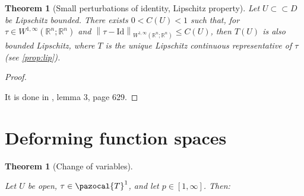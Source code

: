 \documentclass[english,a4paper,9pt,oneside]{scrbook}	%
\theoremstyle{break}
\newtheorem{thm}[equation]{Theorem}
\newtheorem{prop}[equation]{Proposition}
\newenvironment{mproof}[1][\proofname]{%
  \begin{proof}[#1]$ $\par\nobreak\ignorespaces
}{%
  \end{proof}
}
\renewcommand*{\proofname}{Proof}
\theoremstyle{remark}
\newcommand{\mR}{\mathbb{R}}
\newcommand{\norm}[1]{\left\lVert#1\right\rVert}
\newcommand{\cc}{\subset\subset}
\newcommand{\cT}{\pazocal{T}}
\newcommand{\id}{\text{Id}}
\newcommand{\te}{\theta}
\newcommand{\Te}{\Theta}
\begin{document}
\begin{appendices}
\begin{thm}[Small perturbations of identity, Lipschitz property]
\label{thm:ptb_id_lip}
Let $U\cc D$ be Lipschitz bounded. There exists $0<C(U)<1$ such that, for $\tau \in W^{1,\infty}(\mR^n;\mR^n)$ and $\norm{\tau - \id}_{W^{1,\infty}(\mR^n;\mR^n)}\leq C(U)$, then $T(U)$ is also bounded Lipschitz, where $T$ is the unique Lipschitz continuous representative of $\tau$ (see \cref{prop:lip}).

\end{thm}

\begin{mproof}
It is done in \cite{bello}, lemma 3, page 629.
\end{mproof}



%
%
%
%
%
%
%
%
%
%
%

\section{Deforming function spaces}

\begin{thm}[Change of variables]
\label{thm:change}

Let $U$ be open, $\tau \in \cT^1$, and let $p \in [ 1,\infty]$. Then:


\end{thm}
\end{appendices}
\end{document}
